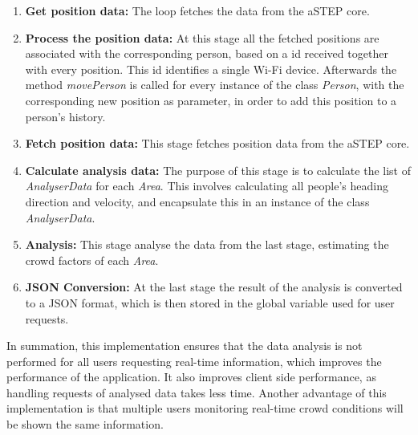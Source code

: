 \begin{enumerate}
	\item \textbf{Get position data:} The loop fetches the data from the aSTEP core.
    \item \textbf{Process the position data:} At this stage all the fetched positions are associated with the corresponding person, based on a id received together with every position. This id identifies a single Wi-Fi device. Afterwards the method \emph{movePerson} is called for every instance of the class \emph{Person}, with the corresponding new position as parameter, in order to add this position to a person's history.
    \item \textbf{Fetch position data:} This stage fetches position data from the aSTEP core.
    \item \textbf{Calculate analysis data:} The purpose of this stage is to calculate the list of \emph{AnalyserData} for each \emph{Area}. This involves calculating all people's heading direction and velocity, and encapsulate this in an instance of the class \emph{AnalyserData}.
    \item \textbf{Analysis:} This stage analyse the data from the last stage, estimating the crowd factors of each \emph{Area}.
    \item \textbf{JSON Conversion:} At the last stage the result of the analysis is converted to a JSON format, which is then stored in the global variable used for user requests.
\end{enumerate}

In summation, this implementation ensures that the data analysis is not performed for all users requesting real-time information, which improves the performance of the application. It also improves client side performance, as handling requests of analysed data takes less time. Another advantage of this implementation is that multiple users monitoring real-time crowd conditions will be shown the same information.